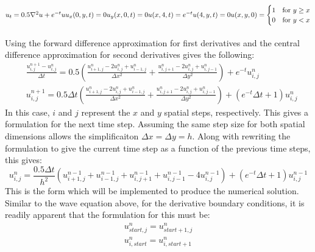 \documentclass{article}
\begin{document}
\subsection*{$u_t = 0.5\nabla^2u + e^{-t}u\\u_x(0,y,t) = 0\\u_y(x,0,t) = 0\\u(x,4,t) = e^{-t}\\u(4,y,t) = 0\\u(x,y,0) = \begin{cases}
1 & \text{for } y \geq x\\
0 & \text{for } y < x
\end{cases}$}
Using the forward difference approximation for first derivatives and the central difference approximation for second derivatives gives the following:
\begin{equation}
    \begin{aligned}
        &\frac{u_{i,j}^{n+1} - u_{i,j}^n}{\Delta t} = 0.5\left(\frac{u_{i+1,j}^n - 2u_{i,j}^n + u_{i-1,j}^n}{\Delta x^2} + \frac{u_{i,j+1}^n - 2u_{i,j}^n + u_{i,j-1}^n}{\Delta y^2}\right) + e^{-t}u_{i,j}^n\\
        &u_{i,j}^{n+1} = 0.5\Delta t\left(\frac{u_{i+1,j}^n - 2u_{i,j}^n + u_{i-1,j}^n}{\Delta x^2} + \frac{u_{i,j+1}^n - 2u_{i,j}^n + u_{i,j-1}^n}{\Delta y^2}\right) + \left(e^{-t}\Delta t + 1\right)u_{i,j}^n
    \end{aligned}
\end{equation}
In this case, $i$ and $j$ represent the $x$ and $y$ spatial steps, respectively. This gives a formulation for the next time step. Assuming the same step size for both spatial dimensions allows the simplificaiton $\Delta x = \Delta y = h$. Along with rewriting the formulation to give the current time step as a function of the previous time steps, this gives:
\begin{equation}
    u_{i,j}^n = \frac{0.5\Delta t}{h^2}\left(u_{i+1,j}^{n-1} + u_{i-1,j}^{n-1} + u_{i,j+1}^{n-1} + u_{i,j-1}^{n-1} - 4u_{i,j}^{n-1}\right) + \left(e^{-t}\Delta t + 1\right)u_{i,j}^{n-1}
\end{equation}
This is the form which will be implemented to produce the numerical solution. Similar to the wave equation above, for the derivative boundary conditions, it is readily apparent that the formulation for this must be:
\begin{equation}
    \begin{aligned}
        u_{start,j}^n = u_{start+1,j}^n\\
        u_{i,start}^n = u_{i,start+1}^n
    \end{aligned}
\end{equation}
\end{document}

